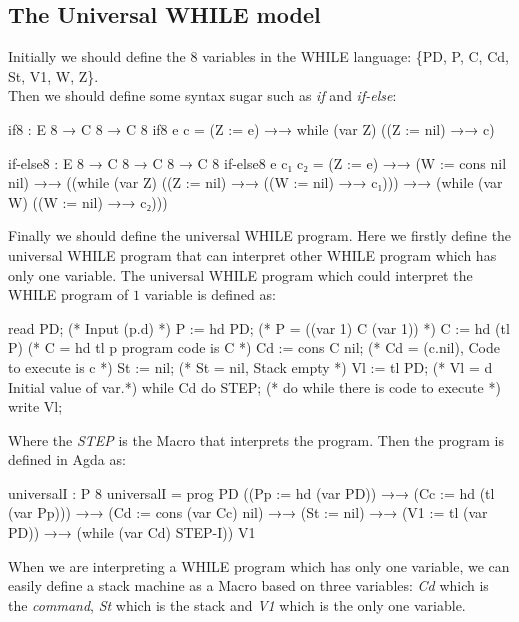 \documentclass{jfrarticle}
\begin{document}
\subsection{The Universal WHILE model}
Initially we should define the 8 variables in the WHILE language: \{PD, P, C, Cd, St, V1, W, Z\}.\\
Then we should define some syntax sugar such as \textit{if} and \textit{if-else}:
\begin{code}[fontsize=\footnotesize]
if8 : E 8 → C 8 → C 8
if8 e c = (Z := e) →→ while (var Z) ((Z := nil) →→ c)

if-else8 : E 8 → C 8 → C 8 → C 8
if-else8 e c₁ c₂ = (Z := e) →→
                   (W := cons nil nil) →→
                   ((while (var Z)
                           ((Z := nil) →→
                           ((W := nil) →→
                           c₁))) →→
                   (while (var W)
                          ((W := nil) →→
                          c₂)))
\end{code}
Finally we should define the universal WHILE program.
Here we firstly define the universal WHILE program that can interpret other WHILE program which has only one variable.
The universal WHILE program which could interpret the WHILE program of $1$ variable is defined as:
\begin{code}[fontsize=\small]
read PD;             (* Input (p.d) *)
  P := hd PD;        (* P = ((var 1) C (var 1)) *)
  C := hd (tl P)     (* C = hd tl p program code is C *)
  Cd := cons C nil;  (* Cd = (c.nil), Code to execute is c *)
  St := nil;         (* St = nil, Stack empty *)
  Vl := tl PD;       (* Vl = d Initial value of var.*)
  while Cd do STEP;  (* do while there is code to execute *)
write Vl;
\end{code}
Where the \textit{STEP} is the Macro that interprets the program.
Then the program is defined in Agda as:
\begin{code}[fontsize=\small]
universalI : P 8
universalI = prog PD ((Pp := hd (var PD))
                     →→
                     (Cc := hd (tl (var Pp)))
                     →→
                     (Cd := cons (var Cc) nil)
                     →→
                     (St := nil)
                     →→
                     (V1 := tl (var PD))
                     →→
                     (while (var Cd) STEP-I))
                  V1

\end{code}
When we are interpreting a WHILE program which has only one variable, we can easily define a stack machine as a Macro based on three variables: \textit{Cd} which is the \textit{command}, \textit{St} which is the stack and \textit{V1} which is the only one variable.
\end{document}
